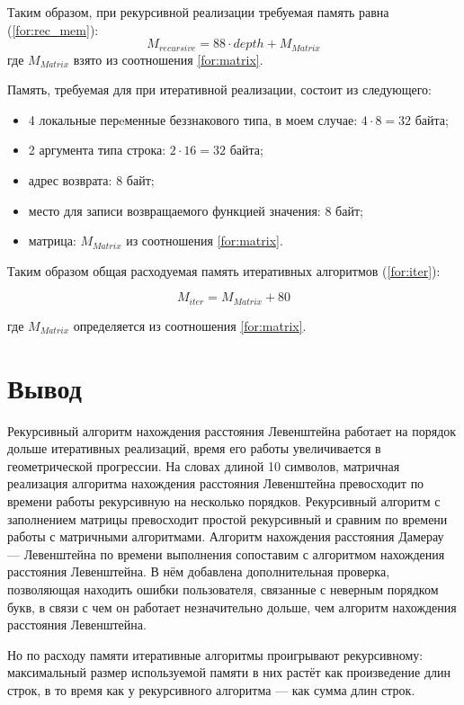 Таким образом, при рекурсивной реализации требуемая память равна (\ref{for:rec_mem}):
\begin{equation}
M_{recursive} = 88 \cdot depth + M_{Matrix}
\label{for:rec_mem}
\end{equation}
где $M_{Matrix}$ взято из соотношения \ref{for:matrix}.

Память, требуемая для при итеративной реализации, состоит из следующего:
\begin{itemize}
    \item 4 локальные перeменные беззнакового типа, в моем случае: $4 \cdot 8 = 32$ байта;
    \item 2 аргумента типа строка: $2 \cdot 16 = 32$ байта;
    \item адрес возврата: 8 байт;
    \item место для записи возвращаемого функцией значения: 8 байт;
    \item матрица: $M_{Matrix}$ из соотношения \ref{for:matrix}.
\end{itemize}

Таким образом общая расходуемая память итеративных алгоритмов (\ref{for:iter}):

\begin{equation}
M_{iter} = M_{Matrix} + 80
\label{for:iter}
\end{equation}

где $M_{Matrix}$ определяется из соотношения \ref{for:matrix}.


\section*{Вывод}

Рекурсивный алгоритм нахождения расстояния Левенштейна работает на порядок дольше итеративных реализаций, время его работы увеличивается в геометрической прогрессии. На словах длиной 10 символов, матричная реализация алгоритма нахождения расстояния Левенштейна превосходит по времени работы рекурсивную на несколько порядков. Рекурсивный алгоритм с заполнением матрицы превосходит простой рекурсивный и сравним по времени работы с матричными алгоритмами. Алгоритм нахождения расстояния Дамерау — Левенштейна по времени выполнения сопоставим с алгоритмом нахождения расстояния Левенштейна. В нём добавлена дополнительная проверка, позволяющая находить ошибки пользователя, связанные с неверным порядком букв, в связи с чем он работает незначительно дольше, чем алгоритм нахождения расстояния Левенштейна.

Но по расходу памяти итеративные алгоритмы проигрывают рекурсивному: максимальный размер используемой памяти в них растёт как произведение длин строк, в то время как у рекурсивного алгоритма — как сумма длин строк.
